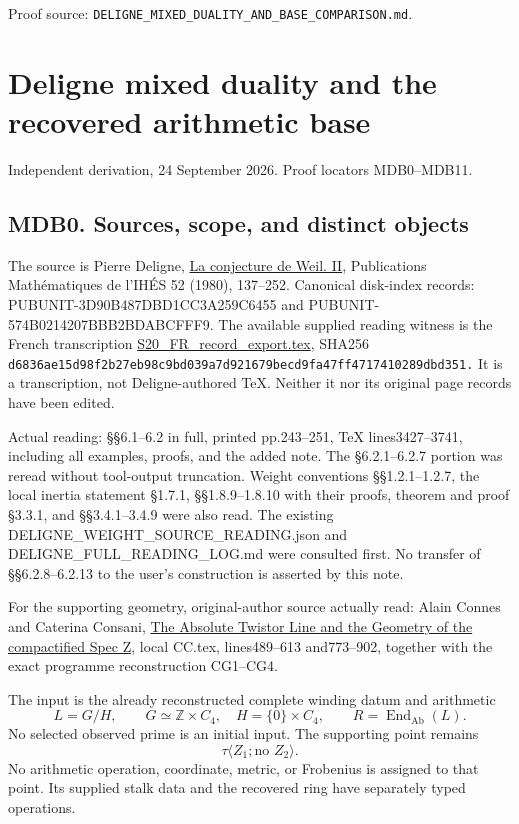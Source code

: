 \documentclass[
]{report}
\begin{document}
Proof source: \nolinkurl{DELIGNE_MIXED_DUALITY_AND_BASE_COMPARISON.md}.

\chapter{Deligne mixed duality and the recovered arithmetic
base}\label{deligne-mixed-duality-and-the-recovered-arithmetic-base}

Independent derivation, 24 September 2026. Proof locators MDB0--MDB11.

\section{MDB0. Sources, scope, and distinct
objects}\label{mdb0.-sources-scope-and-distinct-objects}

The source is Pierre Deligne,
\href{https://www.numdam.org/item/PMIHES_1980__52__137_0/}{La conjecture
de Weil. II}, Publications Mathématiques de l'IHÉS 52 (1980), 137--252.
Canonical disk-index records: PUBUNIT-3D90B487DBD1CC3A259C6455 and
PUBUNIT-574B0214207BBB2BDABCFFF9. The available supplied reading witness
is the French transcription
\href{https://www.numdam.org/item/PMIHES_1980__52__137_0/}{S20\_FR\_record\_export.tex},
SHA256
\nolinkurl{d6836ae15d98f2b27eb98c9bd039a7d921679becd9fa47ff4717410289dbd351.}
It is a transcription, not Deligne-authored TeX. Neither it nor its
original page records have been edited.

Actual reading: §§6.1--6.2 in full, printed pp.243--251, TeX
lines3427--3741, including all examples, proofs, and the added note. The
§6.2.1--6.2.7 portion was reread without tool-output truncation. Weight
conventions §§1.2.1--1.2.7, the local inertia statement §1.7.1,
§§1.8.9--1.8.10 with their proofs, theorem and proof §3.3.1, and
§§3.4.1--3.4.9 were also read. The existing
DELIGNE\_WEIGHT\_SOURCE\_READING.json and DELIGNE\_FULL\_READING\_LOG.md
were consulted first. No transfer of §§6.2.8--6.2.13 to the user's
construction is asserted by this note.

For the supporting geometry, original-author source actually read: Alain
Connes and Caterina Consani,
\href{https://arxiv.org/html/2609.00299v1}{The Absolute Twistor Line and
the Geometry of the compactified Spec Z}, local CC.tex, lines489--613
and773--902, together with the exact programme reconstruction CG1--CG4.

The input is the already reconstructed complete winding datum and
arithmetic \[
L=G/H,\qquad G\simeq\mathbb Z\times C_4,\quad H=\{0\}\times C_4,\qquad
R=\operatorname{End}_{\mathrm{Ab}}(L).
\tag{MDB0.1}
\] No selected observed prime is an initial input. The supporting point
remains \[
\tau\langle Z_1;\text{no }Z_2\rangle.
\tag{MDB0.2}
\] No arithmetic operation, coordinate, metric, or Frobenius is assigned
to that point. Its supplied stalk data and the recovered ring have
separately typed operations.
\end{document}
